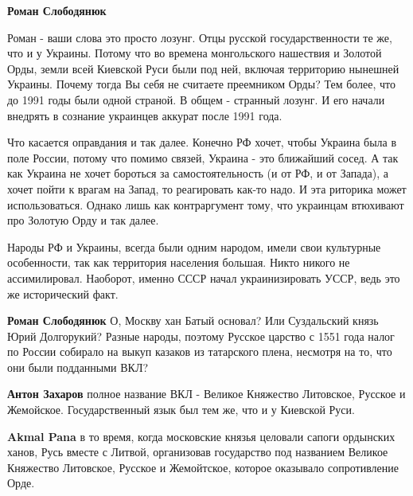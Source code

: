 \begin{itemize}
\begin{itemize}
\textbf{Роман Слободянюк} 

Роман - ваши слова это просто лозунг. Отцы русской государственности те же, что
и у Украины. Потому что во времена монгольского нашествия и Золотой Орды, земли
всей Киевской Руси были под ней, включая территорию нынешней Украины. Почему
тогда Вы себя не считаете преемником Орды? Тем более, что до 1991 годы были
одной страной. В общем - странный лозунг. И его начали внедрять в сознание
украинцев аккурат после 1991 года.

Что касается оправдания и так далее. Конечно РФ хочет, чтобы Украина была в
поле России, потому что помимо связей, Украина - это ближайший сосед. А так как
Украина не хочет бороться за самостоятельность (и от РФ, и от Запада), а хочет
пойти к врагам на Запад, то реагировать как-то надо. И эта риторика может
использоваться. Однако лишь как контраргумент тому, что украинцам втюхивают про
Золотую Орду и так далее.

Народы РФ и Украины, всегда были одним народом, имели свои культурные
особенности, так как территория населения большая. Никто никого не
ассимилировал. Наоборот, именно СССР начал украинизировать УССР, ведь это же
исторический факт.

 
\textbf{Роман Слободянюк} О, Москву хан Батый основал? Или Суздальский князь Юрий Долгорукий? Разные народы, поэтому Русское царство с 1551 года налог по России собирало на выкуп казаков из татарского плена, несмотря на то, что они были подданными ВКЛ?

 
\textbf{Антон Захаров} полное название ВКЛ - Великое Княжество Литовское, Русское и Жемойское. Государственный язык был тем же, что и у Киевской Руси.

 
\textbf{Akmal Pana} в то время, когда московские князья целовали сапоги ордынских ханов, Русь вместе с Литвой, организовав государство под названием Великое Княжество Литовское, Русское и Жемойтское, которое оказывало сопротивление Орде.


\end{itemize}
\end{itemize}
